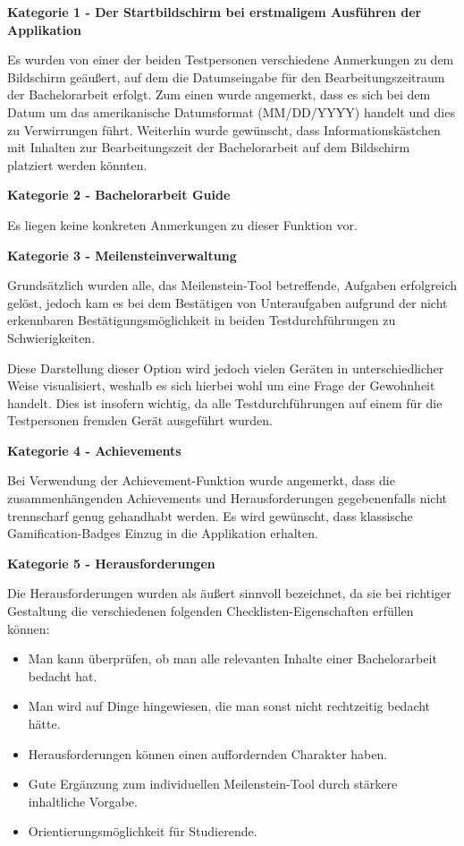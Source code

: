 \documentclass[bibliography=totoc,listof=totoc,BCOR=5mm,DIV=12,oneside]{scrbook}
\begin{document}
\par \bigskip \textbf{Kategorie 1 - Der Startbildschirm bei erstmaligem Ausführen der Applikation}
\par Es wurden von einer der beiden Testpersonen verschiedene Anmerkungen zu dem Bildschirm geäußert, auf dem die Datumseingabe für den Bearbeitungszeitraum der Bachelorarbeit erfolgt. Zum einen wurde angemerkt, dass es sich bei dem Datum um das amerikanische Datumsformat (MM/DD/YYYY) handelt und dies zu Verwirrungen führt. Weiterhin wurde gewünscht, dass Informationskästchen mit Inhalten zur Bearbeitungszeit der Bachelorarbeit auf dem Bildschirm platziert werden könnten.

\par \bigskip \textbf{Kategorie 2 - Bachelorarbeit Guide}
\par Es liegen keine konkreten Anmerkungen zu dieser Funktion vor.

\par \bigskip \textbf{Kategorie 3 - Meilensteinverwaltung}
\par Grundsätzlich wurden alle, das Meilenstein-Tool betreffende, Aufgaben erfolgreich gelöst, jedoch kam es bei dem Bestätigen von Unteraufgaben aufgrund der nicht erkennbaren Bestätigungsmöglichkeit in beiden Testdurchführungen zu Schwierigkeiten.
\par Diese Darstellung dieser Option wird jedoch vielen Geräten in unterschiedlicher Weise visualisiert, weshalb es sich hierbei wohl um eine Frage der Gewohnheit handelt. Dies ist insofern wichtig, da alle Testdurchführungen auf einem für die Testpersonen fremden Gerät ausgeführt wurden.

\par \bigskip \textbf{Kategorie 4 - Achievements}
\par Bei Verwendung der Achievement-Funktion wurde angemerkt, dass die zusammenhängenden Achievements und Herausforderungen gegebenenfalls nicht trennscharf genug gehandhabt werden. Es wird gewünscht, dass klassische Gamification-Badges Einzug in die Applikation erhalten.

\par \bigskip \textbf{Kategorie 5 - Herausforderungen}
\par Die Herausforderungen wurden als äußert sinnvoll bezeichnet, da sie bei richtiger Gestaltung die verschiedenen folgenden Checklisten-Eigenschaften erfüllen können:
\begin{itemize}
\item Man kann überprüfen, ob man alle relevanten Inhalte einer Bachelorarbeit bedacht hat.
\item Man wird auf Dinge hingewiesen, die man sonst nicht rechtzeitig bedacht hätte.
\item Herausforderungen können einen auffordernden Charakter haben.
\item Gute Ergänzung zum individuellen Meilenstein-Tool durch stärkere inhaltliche Vorgabe.
\item Orientierungsmöglichkeit für Studierende.
\end{itemize}
\end{document}
